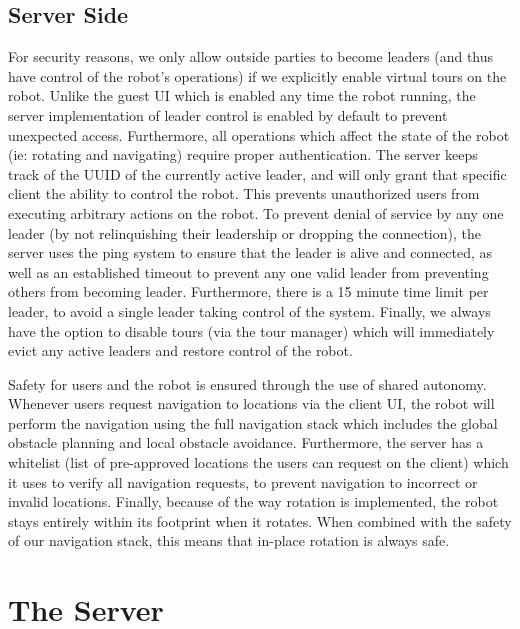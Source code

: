 \documentclass[
  oneside,
  11pt, a4paper,
  footinclude=true,
  headinclude=true,
  cleardoublepage=empty
]{article}
\begin{document}
\subsection{Server Side}

For security reasons, we only allow outside parties to become leaders (and thus
have control of the robot's operations) if we explicitly enable virtual tours
on the robot. Unlike the guest UI which is enabled any time the robot running,
the server implementation of leader control is enabled by default to prevent
unexpected access. Furthermore, all operations which affect the state of the
robot (ie: rotating and navigating) require proper authentication. The server
keeps track of the UUID of the currently active leader, and will only grant
that specific client the ability to control the robot. This prevents
unauthorized users from executing arbitrary actions on the robot. To prevent
denial of service by any one leader (by not relinquishing their leadership or
dropping the connection), the server uses the ping system to ensure that the
leader is alive and connected, as well as an established timeout to prevent any
one valid leader from preventing others from becoming leader. Furthermore,
there is a 15 minute time limit per leader, to avoid a single leader taking
control of the system. Finally, we always have the option to disable tours (via
the tour manager) which will immediately evict any active leaders and restore
control of the robot.

Safety for users and the robot is ensured through the use of shared autonomy.
Whenever users request navigation to locations via the client UI, the robot
will perform the navigation using the full navigation stack which includes the
global obstacle planning and local obstacle avoidance. Furthermore, the server
has a whitelist (list of pre-approved locations the users can request on the
client) which it uses to verify all navigation requests, to prevent navigation
to incorrect or invalid locations. Finally, because of the way rotation is
implemented, the robot stays entirely within its footprint when it rotates.
When combined with the safety of our navigation stack, this means that in-place
rotation is always safe.


\section{The Server}\label{sec:server}
\end{document}
